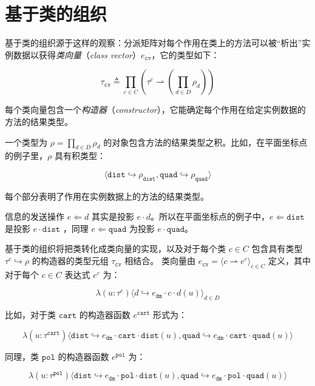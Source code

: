 \section{基于类的组织}

基于类的组织源于这样的观察：分派矩阵对每个作用在类上的方法可以被“析出”实例数据以获得\textit{类向量}（\textit{class vector}）$ e_{\mathtt{cv}} $，它的类型如下：

$$ \tau_{\mathtt{cv}} \triangleq \prod_{c \in C}(\tau^{c} \rightharpoonup (\prod_{d \in D} \rho_{d})) $$

每个类向量包含一个\textit{构造器}（\textit{constructor}），它能确定每个作用在给定实例数据的方法的结果类型。

一个类型为 $ \rho = \prod_{d \in D} \rho_{d} $ 的对象包含方法的结果类型之积。比如，在平面坐标点的例子里，$ \rho $ 具有积类型：

$$ \langle \mathtt{dist} \hookrightarrow \rho_{\mathtt{dist}}, \mathtt{quad} \hookrightarrow \rho_{\mathtt{quad}} \rangle $$

每个部分表明了作用在实例数据上的方法的结果类型。

信息的发送操作 $e \Leftarrow d $ 其实是投影 $ e \cdot d $。所以在平面坐标点的例子中，$e \Leftarrow \mathtt{dist} $ 是投影 $ e \cdot \mathtt{dist} $ ，同理 $ e \Leftarrow \mathtt{quad} $ 为投影 $ e \cdot \mathtt{quad} $。

基于类的组织将把类转化成类向量的实现，以及对于每个类 $c \in C$ 包含具有类型 $\tau^{c} \hookrightarrow \rho $ 的构造器的类型元组 $ \tau_{\mathtt{cv}} $ 相结合。
类向量由 $ e_{\mathtt{cv}} = \langle c \rightharpoonup e^{c} \rangle_{c \in C} $ 定义，其中对于每个 $c \in C$ 表达式 $ e^{c} $ 为：

$$ \lambda(u : \tau^{c})\langle d \hookrightarrow e_{\mathtt{dm}} \cdot c \cdot d(u) \rangle_{d \in D} $$

比如，对于类 $ \mathtt{cart} $ 的构造器函数 $e^{\mathtt{cart}}$ 形式为：

$$ \lambda(u : \tau^{\mathtt{cart}}) \langle \mathtt{dist} \hookrightarrow e_{\mathtt{dm}} \cdot \mathtt{cart} \cdot \mathtt{dist}(u), \mathtt{quad} \hookrightarrow e_{\mathtt{dm}} \cdot \mathtt{cart} \cdot \mathtt{quad}(u) \rangle $$

同理，类 $ \mathtt{pol} $ 的构造器函数 $e^{\mathtt{pol}}$ 为：

$$ \lambda(u : \tau^{\mathtt{pol}}) \langle \mathtt{dist} \hookrightarrow e_{\mathtt{dm}} \cdot {\mathtt{pol}} \cdot \mathtt{dist}(u), \mathtt{quad} \hookrightarrow e_{\mathtt{dm}} \cdot {\mathtt{pol}} \cdot \mathtt{quad}(u) \rangle $$

